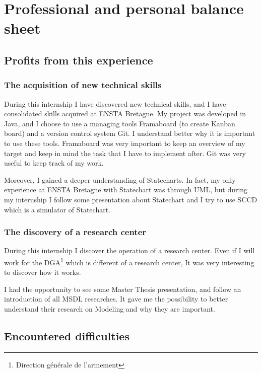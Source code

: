 
\chapter{Professional and personal balance sheet}

\section{Profits from this experience}

\subsection{The acquisition of new technical skills}

During this internship I have discovered new technical skills, and I have consolidated skills acquired at ENSTA Bretagne. My project was developed in Java, and I choose to use a managing tools Framaboard (to create Kanban board) and a version control system Git. I understand better why it is important to use these tools. Framaboard was very important to keep an overview of my target and keep in mind the task that I have to implement after. Git was very useful to keep track of my work.

Moreover, I gained a deeper understanding of Statecharts. In fact, my only experience at ENSTA Bretagne with Statechart was through UML, but during my internship I follow some presentation about Statechart and I try to use SCCD which is a simulator of Statechart.



\subsection{The discovery of a research center}

During this internship I discover the operation of a research center. Even if I will work for the DGA\footnote{Direction générale de l'armement} which is different of a research center, It was very interesting to discover how it works.

I had the opportunity to see some Master Thesis presentation, and follow an introduction of all MSDL researches. It gave me the possibility to better understand their research on Modeling and why they are important.


\section{Encountered difficulties}

